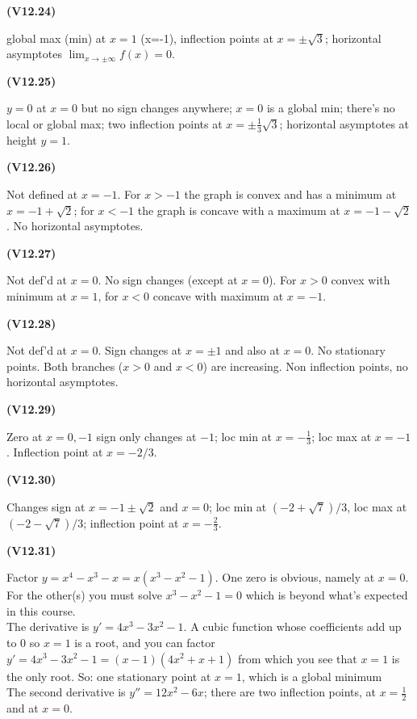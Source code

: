 \documentclass[openany,reqno]{amsbook}
\begin{document}
\begin{trivlist}
\item[{\bf(V12.24)}]

  global max (min) at $x=1$ (x=-1), inflection points at $x=\pm\surd3$;
  horizontal asymptotes $\lim_{x\to \pm\infty}f(x) = 0$.
  \bigskip

\item[{\bf(V12.25)}]

  $y=0$ at $x=0$ but no sign changes anywhere;  $x=0$ is a global min;
  there's no local or global max;  two inflection points at
  $x=\pm\frac13\surd3$; horizontal asymptotes at height $y=1$.
  \bigskip

\item[{\bf(V12.26)}]

  Not defined at $x=-1$.  For $x>-1$ the graph is convex and has a
  minimum at $x=-1+\surd2$;  for $x<-1$ the graph is concave with a
  maximum at $x=-1-\surd2$.  No horizontal asymptotes.
  \bigskip

\item[{\bf(V12.27)}]

  Not def'd at $x=0$. No sign changes (except at $x=0$).
  For $x>0$ convex with minimum at $x=1$, for $x<0$ concave
  with maximum at $x=-1$.
  \bigskip

\item[{\bf(V12.28)}]

  Not def'd at $x=0$. Sign changes at $x=\pm1$ and also at $x=0$.
  No stationary points.  Both branches ($x>0$ and $x<0$) are
  increasing.  Non inflection points, no horizontal asymptotes.
  \bigskip

\item[{\bf(V12.29)}]

  Zero at $x=0, -1 $ sign only changes at $-1$;  loc min at
  $x=-\frac13$; loc max at $x=-1$.  Inflection point at $x=-2/3$.
  \bigskip

\item[{\bf(V12.30)}]

  Changes sign at $x=-1\pm\surd2$ and $x=0$; loc min at
  $(-2+\surd7)/3$, loc max at $(-2-\surd7)/3$; inflection point at
  $x=-\frac23$.
  \bigskip

\item[{\bf(V12.31)}]

  Factor $y=x^4-x^3-x=x(x^3-x^2-1)$.  One zero is obvious, namely
  at $x=0$.  For the other(s) you must solve $x^3-x^2-1=0$ which is
  beyond what's expected in this course.\\
  The derivative is $y'=4x^3-3x^2-1$.  A cubic function whose
  coefficients add up to 0 so $x=1$ is a root, and you can factor
  $y'=4x^3-3x^2-1= (x-1)(4x^2+x+1)$ from which you see that $x=1$
  is the only root.  So: one stationary point at $x=1$, which is a
  global minimum\\
  The second derivative is $y''=12x^2-6x$; there are two inflection
  points, at $x=\frac12$ and at $x=0$.
  \bigskip


\end{trivlist}
\end{document}
